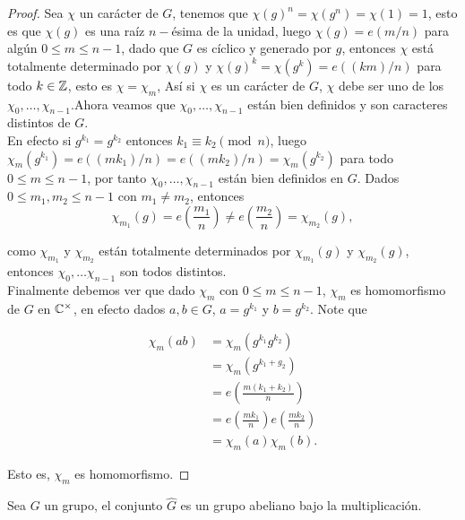 \begin{proof}
Sea $\chi$ un carácter de $G$, tenemos que $\chi(g)^n=\chi(g^n)=\chi(1)=1$, esto es que $\chi(g)$ es una raíz $n-$ésima de la unidad, luego $\chi(g)=e(m/n)$ para algún $0\leq m\leq n-1$, dado  que $G$ es cíclico y generado por $g$, entonces $\chi$ está totalmente determinado por $\chi(g)$ y $\chi(g)^k=\chi(g^k)=e((km)/n)$ para todo $k\in \mathbb{Z}$, esto es $\chi=\chi_m$, Así si $\chi$ es un carácter de $G$, $\chi$ debe ser uno de los $\chi_0,\ldots,\chi_{n-1}$.Ahora veamos que $\chi_0,\ldots,\chi_{n-1}$ están bien definidos y son caracteres distintos de $G$.\\

En efecto si $g^{k_1}=g^{k_2}$ entonces $k_1\equiv k_2\pmod{n}$, luego $\chi_m(g^{k_1})=e\left((mk_1)/n\right)=e\left((mk_2)/n\right)=\chi_m(g^{k_2})$ para todo $0\leq m\leq n-1$, por tanto $\chi_0,\ldots,\chi_{n-1}$ están bien definidos en $G$. Dados $0\leq m_1,m_2\leq n-1$ con $m_1\neq m_2$, entonces
$$\displaystyle\chi_{m_1}(g)=e\left(\frac{m_1}{n}\right)\neq e\left(\frac{m_2}{n}\right)=\chi_{m_2}(g),$$

como $\chi_{m_1}$ y $\chi_{m_2}$ están totalmente determinados por $\chi_{m_1}(g)$ y $\chi_{m_2}(g)$, entonces $\chi_0,\ldots\chi_{n-1}$ son todos distintos.\\

Finalmente debemos ver que dado $\chi_m$ con $0\leq m\leq n-1$, $\chi_m$ es homomorfismo de $G$ en $\mathbb{C}^{\times}$, en efecto dados $a,b\in G$, $a=g^{k_1}$ y $b=g^{k_2}$. Note que

\begin{align*}
\chi_m(ab)&=\chi_m(g^{k_1}g^{k_2})\\
&=\chi_m(g^{k_1+g_2})\\
&=e\left(\frac{m(k_1+k_2)}{n}\right)\\
&=e\left(\frac{mk_1}{n}\right)e\left(\frac{mk_2}{n}\right)\\
&=\chi_m(a)\chi_m(b)
.\end{align*}

Esto es, $\chi_m$ es homomorfismo.
\end{proof}

\begin{theorem}
Sea $G$ un grupo, el  conjunto $\widehat{G}$ es un grupo abeliano bajo la multiplicación.
\end{theorem}

